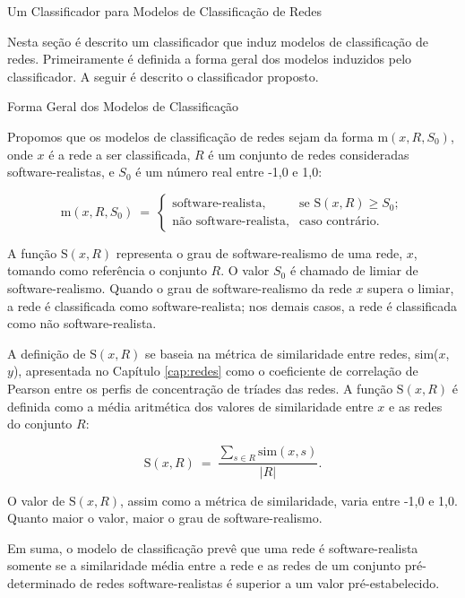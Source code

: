 \begin{section}{Um Classificador para Modelos de Classificação de Redes} \label{cap:clas2}
	
	Nesta seção é descrito um classificador que induz modelos de classificação de redes. Primeiramente é definida a forma geral dos modelos induzidos pelo classificador. A seguir é descrito o classificador proposto.
	
\begin{subsection}{Forma Geral dos Modelos de Classificação}
	
	Propomos que os modelos de classificação de redes sejam da forma $\mathrm{m}(x, R, S_0)$, onde $x$ é a rede a ser classificada, $R$ é um conjunto de redes consideradas software-realistas, e $S_0$ é um número real entre -1,0 e 1,0:
	
$$
	\mathrm{m}(x, R, S_0) ~=~
	\left\{
	\begin{array}{cl}
	\mbox{software-realista,} & \mbox{se } \mathrm{S}(x, R) \ge S_0; \\
	\mbox{não software-realista,} & \mbox{caso contrário.}
	\end{array}
	\right.
$$
	
	A função $\mathrm{S}(x, R)$ representa o grau de software-realismo de uma rede, $x$, tomando como referência o conjunto $R$. O valor $S_0$ é chamado de limiar de software-realismo. Quando o grau de software-realismo da rede $x$ supera o limiar, a rede é classificada como software-realista; nos demais casos, a rede é classificada como não software-realista.
	
	A definição de $\mathrm{S}(x, R)$ se baseia na métrica de similaridade entre redes, sim($x$, $y$), apresentada no Capítulo \ref{cap:redes} como o coeficiente de correlação de Pearson entre os perfis de concentração de tríades das redes. A função $\mathrm{S}(x, R)$ é definida como a média aritmética dos valores de similaridade entre $x$ e as redes do conjunto $R$:

	$$
	\mathrm{S}(x, R) ~=~ \frac{
	\displaystyle\sum_{s \in R} \mathrm{sim}(x, s)
	}{|R|} \mbox{.}
	$$

	O valor de $\mathrm{S}(x, R)$, assim como a métrica de similaridade, varia entre -1,0 e 1,0. Quanto maior o valor, maior o grau de software-realismo.
	
	Em suma, o modelo de classificação prevê que uma rede é software-realista somente se a similaridade média entre a rede e as redes de um conjunto pré-determinado de redes software-realistas é superior a um valor pré-estabelecido.
	

\end{subsection}
\end{section}
